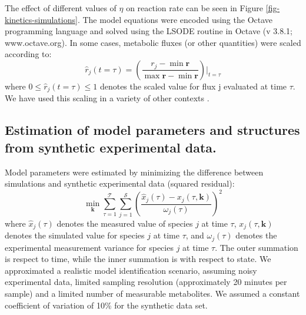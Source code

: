 \documentclass[processes,article,accept,moreauthors,pdftex,12pt,a4paper]{mdpi}
\begin{document}
The effect of different values of $\eta$ on reaction rate can be seen in Figure \ref{fig-kinetics-simulations}.
The model equations were encoded using the Octave programming language and solved using the LSODE routine in Octave (v 3.8.1; www.octave.org). 
In some cases, metabolic fluxes (or other quantities) were scaled according to:
\begin{equation}
	\hat{r}_{j}\left(t = \tau\right) = \left(\frac{r_{j} - \min\mathbf{r}}{\max\mathbf{r} - \min\mathbf{r}}\right)\Bigr|_{t = \tau}
\end{equation}where $0\leq\hat{r}_{j}\left(t = \tau\right)\leq{1}$ denotes the scaled value for flux j evaluated at time $\tau$. 
We have used this scaling in a variety of other contexts \citep{Song:2010ab,Lequieu:2011aa}.

\subsection*{Estimation of model parameters and structures from synthetic experimental data.}
Model parameters were estimated by minimizing the difference between simulations and synthetic experimental data (squared residual):
\begin{equation}\label{eqn:objective-function}
	\min_{\mathbf{k}} \sum_{\tau=1}^{\mathcal{T}}\sum_{j=1}^{\mathcal{S}}\left(\frac{\hat{x}_{j}\left(\tau\right) - x_{j}\left(\tau,\mathbf{k}\right)}{\omega_{j}\left(\tau\right)}\right)^{2}
\end{equation}where $\hat{x}_{j}\left(\tau\right)$ denotes the measured value of species $j$ at time $\tau$, $x_{j}\left(\tau,\mathbf{k}\right)$ denotes the simulated 
value for species $j$ at time $\tau$, and $\omega_{j}\left(\tau\right)$ denotes the experimental measurement variance for species $j$ at time $\tau$. The outer summation is respect to
time, while the inner summation is with respect to state. We approximated a realistic model identification scenario, assuming noisy experimental data, 
limited sampling resolution (approximately 20 minutes per sample) and a limited number of measurable metabolites. We assumed a constant coefficient of variation of 10\% for the synthetic data set.
\end{document}
